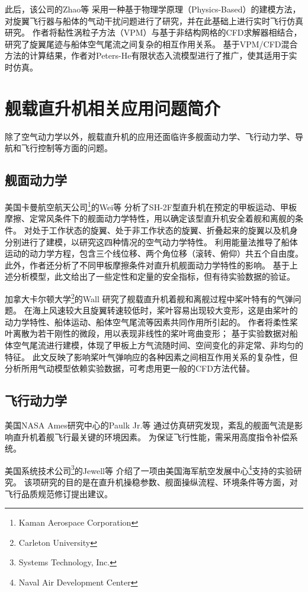 \documentclass[doctor,openright,twoside,color]{buaathesis}
\begin{document}
此后，该公司的Zhao等
采用一种基于物理学原理（Physics-Based）的建模方法，对旋翼飞行器与船体的气动干扰问题进行了研究，并在此基础上进行实时飞行仿真研究。
作者将黏性涡粒子方法（VPM）与基于非结构网格的CFD求解器相结合，研究了旋翼尾迹与船体空气尾流之间复杂的相互作用关系。
基于VPM/CFD混合方法的计算结果，作者对Peters-He有限状态入流模型进行了推广，使其适用于实时仿真。

\section{舰载直升机相关应用问题简介}
除了空气动力学以外，舰载直升机的应用还面临许多舰面动力学、飞行动力学、导航和飞行控制等方面的问题。

\subsection{舰面动力学}
美国卡曼航空航天公司\footnote{Kaman Aerospace Corporation}的Wei等
分析了SH-2F型直升机在预定的甲板运动、甲板摩擦、定常风条件下的舰面动力学特性，用以确定该型直升机安全着舰和离舰的条件。
对处于工作状态的旋翼、处于非工作状态的旋翼、折叠起来的旋翼以及机身分别进行了建模，以研究这四种情况的空气动力学特性。
利用能量法推导了船体运动的动力学方程，包含三个线位移、两个角位移（滚转、俯仰）共五个自由度。
此外，作者还分析了不同甲板摩擦条件对直升机舰面动力学特性的影响。
基于上述分析模型，此文给出了一些定性和定量的安全指标，但有待实验数据的验证。

加拿大卡尔顿大学\footnote{Carleton University}的Wall
研究了舰载直升机着舰和离舰过程中桨叶特有的气弹问题。
在海上风速较大且旋翼转速较低时，桨叶容易出现较大变形，这是由桨叶的动力学特性、船体运动、船体空气尾流等因素共同作用所引起的。
作者将柔性桨叶离散为若干刚性的微段，用以表现非线性的桨叶弯曲变形；
基于实验数据对船体空气尾流进行建模，体现了甲板上方气流随时间、空间变化的非定常、非均匀的特征。
此文反映了影响桨叶气弹响应的各种因素之间相互作用关系的复杂性，但分析所用气动模型依赖实验数据，可考虑用更一般的CFD方法代替。

\subsection{飞行动力学}

美国NASA Ames研究中心的Paulk Jr.等
通过仿真研究发现，紊乱的舰面气流是影响直升机着舰飞行最关键的环境因素。
为保证飞行性能，需采用高度指令补偿系统。

美国系统技术公司\footnote{Systems Technology, Inc.}的Jewell等
介绍了一项由美国海军航空发展中心\footnote{Naval Air Development Center}支持的实验研究。
该项研究的目的是在直升机操稳参数、舰面操纵流程、环境条件等方面，对飞行品质规范修订提出建议。
\end{document}
